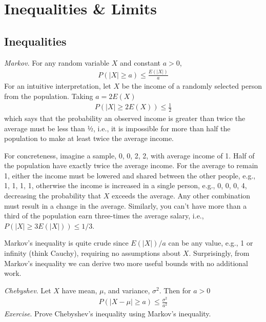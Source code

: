 


\maketitle
\clearpage

\section{Inequalities \& Limits}

\subsection{Inequalities}

\emph{Markov}. 
For any random variable \(X\) and constant \(a > 0\),
\begin{align}
P\left( |X| \geq a \right) \leq \frac{E\left( |X| \right)}{a}
\end{align}
For an intuitive interpretation, 
let \(X\) be the income of a randomly
selected person from the population. 
Taking \(a = 2E(X)\)
\begin{align}
P\left( |X| \geq 2E(X) \right) \leq \frac{1}{2}
\end{align}
which says that the probability an observed income is greater than twice
the average must be less than ½, i.e., 
it is impossible for more than
half the population to make at least twice the average income.

For concreteness, 
imagine a sample, 0, 0, 2, 2, with average income of 1. 
Half of the population have exactly twice the average income. 
For the average to remain 1, 
either the income must be lowered and shared between the other people, 
e.g., 1, 1, 1, 1, 
otherwise the income is increased in a single person, e.g., 0, 0, 0, 4, 
decreasing the probability that \(X\) exceeds the average. 
Any other combination must result in a change in the average. 
Similarly, 
you can't have more than a third of the population 
earn three-times the average salary, i.e.,
\(P\left( |X| \geq 3E\left( |X| \right) \right) \leq 1/3\).

Markov's inequality is quite crude since \(E(|X|)/a\) can be any value,
e.g., 1 or infinity (think Cauchy), 
requiring no assumptions about \(X\). 
Surprisingly, 
from Markov's inequality we can derive two more
useful bounds with no additional work.

\emph{Chebyshev}. 
Let \(X\) have mean, \(\mu\), and variance, \(\sigma^{2}\). 
Then for \(a > 0\)
\begin{align}
P\left( |X - \mu| \geq a \right) \leq \frac{\sigma^{2}}{a^{2}}
\end{align}
\emph{Exercise}. 
Prove Chebyshev's inequality using Markov's inequality. 


